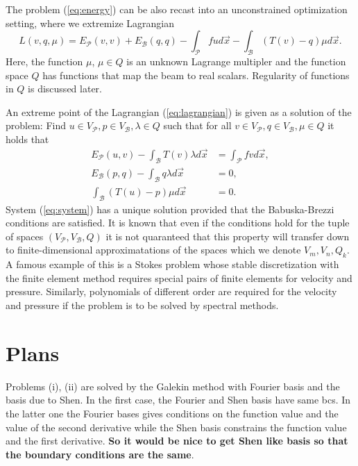 \documentclass[a4paper,10pt]{article}
\newcommand{\Vp}{\ensuremath{V_{\mathcal{P}}}}
\newcommand{\Vb}{\ensuremath{V_{\mathcal{B}}}}
\newcommand{\Ep}{\ensuremath{E_{\mathcal{P}}}}
\newcommand{\Eb}{\ensuremath{E_{\mathcal{B}}}}
\begin{document}
  The problem (\ref{eq:energy}) can be also recast into an unconstrained
  optimization setting, where we extremize Lagrangian
  \begin{equation}
    \label{eq:lagrangian}
    L(v, q, \mu) = \Ep(v, v) + \Eb(q, q) - \int_{\mathcal{P}}f u d\vec{x} -
  \int_{\mathcal{B}}(T(v) - q)\mu d\vec{x}.
  \end{equation}
  Here, the function $\mu$, $\mu\in Q$ is an unknown Lagrange multipler
  and the function space $Q$ has functions that map the beam to real scalars.
  Regularity of functions in $Q$ is discussed later.

  An extreme point of the Lagrangian (\ref{eq:lagrangian}) is given as a
  solution of the problem: Find $u\in\Vp, p\in\Vb, \lambda\in Q$ such that
  for all $v\in\Vp, q\in\Vb, \mu\in Q$ it holds that
 \begin{equation}
    \label{eq:system}
    \begin{aligned}
      \Ep(u, v) - \int_{\mathcal{B}}T(v)\lambda d\vec{x} &= \int_{\mathcal{P}}fvd\vec{x}, \\
      \Eb(p, q) - \int_{\mathcal{B}}q\lambda d\vec{x} &= 0, \\
      \int_{\mathcal{B}}(T(u)-p)\mu d\vec{x} &= 0.
    \end{aligned}
  \end{equation}
  System (\ref{eq:system}) has a unique solution provided that the
  Babuska-Brezzi conditions are satisfied. It is known that even if the
  conditions hold for the tuple of spaces $(\Vp, \Vb, Q)$ it is not quaranteed
  that this property will transfer down to finite-dimensional approximatations
  of the spaces which we denote $V_m, V_n, Q_k$. A famous example of this
  is a Stokes problem whose stable discretization with the finite element method
  requires special pairs of finite elements for velocity and pressure.
  Similarly, polynomials of different order are required for the velocity and
  pressure if the problem is to be solved by spectral methods.

  \section{Plans}

  Problems (i), (ii) are solved by the Galekin method with Fourier basis and
  the basis due to Shen. In the first case, the Fourier and Shen basis have
  same bcs. In the latter one the Fourier bases gives conditions on the function
  value and the value of the second derivative while the Shen basis constrains
  the function value and the first derivative. \textbf{So it would be nice to 
  get Shen like basis so that the boundary conditions are the same}.
\end{document}
